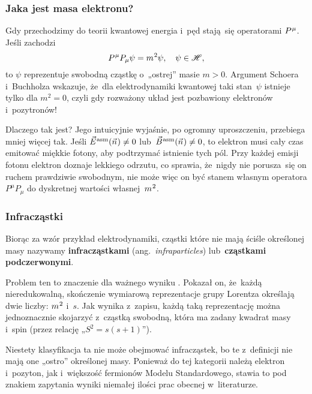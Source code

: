 \documentclass[10pt,t]{beamer}
\begin{document}
\begin{frame}
  \frametitle{Jaka jest masa elektronu?}


  Gdy przechodzimy do teorii kwantowej energia i~pęd stają~się operatorami
  $P^{ \hspace{0.05em} \mu }$. Jeśli zachodzi
  \begin{equation}
    \label{eq:Glowne-rodzaje-problemow-podczerwonych-13}
    P^{ \hspace{0.05em} \mu } P_{ \mu } \psi  = m^{ \hspace{0.05em} 2 } \psi, \quad
    \psi \in \mathcal{H},
  \end{equation}
  to $\psi$ reprezentuje swobodną cząstkę o~„ostrej” masie $m > 0$.
  Argument Schoera i~Buchholza wskazuje, że~dla elektrodynamiki kwantowej
  taki stan~$\psi$ istnieje tylko dla $m^{ 2 } = 0$, czyli gdy rozważony układ
  jest pozbawiony elektronów i~pozytronów!

  Dlaczego tak jest? Jego intuicyjnie wyjaśnie, po ogromny uproszczeniu,
  przebiega mniej więcej tak. Jeśli $\vec{E}^{ \hspace{0.05em} \text{asm} }( \vec{n} \hspace{0.05em} ) \neq 0$ lub~$\vec{B}^{ \hspace{0.05em} \text{asm} }( \vec{n} \hspace{0.05em} ) \neq 0$, to
  elektron musi cały czas emitować miękkie fotony, aby podtrzymać
  istnienie tych pól. Przy każdej emisji fotonu elektron doznaje lekkiego
  odrzutu, co sprawia, że~nigdy nie porusza~się on ruchem prawdziwie
  swobodnym, nie może więc on być stanem własnym operatora
  $P^{ \mu } P_{ \mu }$ do dyskretnej wartości własnej~$m^{ \hspace{0.05em} 2 }$.

\end{frame}





\begin{frame}
  \frametitle{Infracząstki}


  Biorąc za wzór przykład elektrodynamiki, cząstki które nie mają ściśle
  określonej masy nazywamy \textbf{infracząstkami}
  (ang.~\textit{infraparticles}) lub~\textbf{cząstkami podczerwonymi}.

  Problem ten to znaczenie dla ważnego wyniku
  .
  Pokazał on, że~każdą nieredukowalną, skończenie wymiarową reprezentacje
  grupy Lorentza określają dwie liczby: $m^{ \hspace{0.05em} 2 }$ i~$s$. Jak
  wynika z~zapisu, każdą taką reprezentację można jednoznacznie skojarzyć
  z~cząstką swobodną, która ma zadany kwadrat masy i~spin (przez relację
  „$S^{ 2 } = s ( s + 1 )$”).

  Niestety klasyfikacja ta \alert{nie} może obejmować infracząstek, bo
  te z~definicji nie mają one „ostro” określonej masy. Ponieważ do tej
  kategorii należą elektron i~pozyton, jak i~większość fermionów Modelu
  Standardowego, stawia to pod znakiem zapytania wyniki niemałej ilości
  prac obecnej w~literaturze.

\end{frame}
\end{document}

